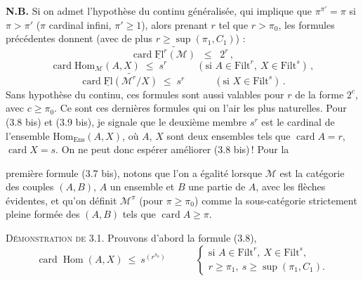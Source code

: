 \documentclass[11pt]{article}
\newcommand{\printedpage}[1]{\marginpar{\footnotesize p.~#1}}
\newcommand{\msp}[1]{\marginpar{\footnotesize [#1]}}
\newcommand{\M}{\mathcal{M}}
\newcommand{\uFl}{\underline{\mathrm{Fl}}}
\newcommand{\cM}{\mathcal{M}}
\newcommand{\Filt}{\mathrm{Filt}}
\newcommand{\card}{\operatorname{card}}
\newcommand{\Hom}{\operatorname{Hom}}
\begin{document}
\textbf{N.B.} Si on admet l'hypothèse du continu généralisée, qui implique que $\pi^{\pi'}=\pi$ si $\pi>\pi'$ ($\pi$ cardinal infini, $\pi'\geq1$), alors prenant $r$ tel que $r>\pi_0$, les formules précédentes donnent (avec de plus $r\geq\sup(\pi_1,C_1)$) :
\[
\card\widetilde{\uFl^r(\cM)} \;\;\leq\;\; 2^r\,,
\tag*{(3.7 bis)}
\]
\[
\card\mathrm{Hom}_{\cM}(A,X) \;\leq\; s^r \qquad\quad (\text{si } A\in\Filt^r,\ X\in\Filt^s)\,,
\tag*{(3.8 bis)}
\]
\[
\card\widetilde{\uFl(\cM^r/X)} \;\leq\; s^r \qquad\quad (\text{si } X\in\Filt^s)\,.
\tag*{(3.9 bis)}
\]
Sans hypothèse du continu, ces formules sont aussi valables pour $r$ de la forme $2^c$, avec $c\geq\pi_0$. Ce sont ces dernières formules qui on l'air les plus naturelles. Pour (3.8 bis) et %
(3.9 bis), je signale que le deuxième membre $s^r$ est le cardinal de l'ensemble $\mathrm{Hom}_{\mathrm{Ens}}(A,X)$, où $A$, $X$ sont deux ensembles tels que $\card A=r$, $\card X=s$. On ne peut donc espérer améliorer (3.8 bis)\,! Pour la

\printedpage{14}
\msp{page 20}
première formule (3.7 bis), notons que l'on a égalité lorsque $\M$ est la catégorie des couples $(A,B)$, $A$ un ensemble et $B$ une partie de $A$, avec les flèches évidentes, et qu'on définit $\M^\pi$ (pour $\pi\geq\pi_0$) comme la sous-catégorie strictement pleine formée des $(A,B)$ tels que $\card A\geq\pi$.

\textsc{Démonstration de} 3.1. Prouvons d'abord la formule (3.8),
\[
\card\Hom(A,X)\ \leq\ s^{(r^{\pi_0})}\qquad\quad
\left\{\begin{array}{l}
\text{si } A\in\Filt^r,\ X\in\Filt^s,\\[1.5ex]
r\geq\pi_1,\ s\geq\sup(\pi_1,C_1).
\end{array}\right.
\]
\end{document}
